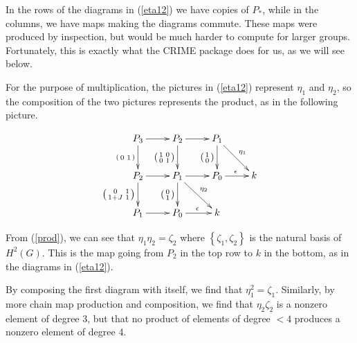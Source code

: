 \documentclass[12pt]{article}
\begin{document}
In the rows of the diagrams in (\ref{eta12}) we have copies
of $P_\ast$, while in the columns, we have maps making the diagrams
commute. These maps were produced by inspection, but would be much
harder to compute for larger groups.
Fortunately, this is exactly what the \textsf{CRIME} package
does for us, as we will see below.

For the purpose of multiplication,
the pictures in (\ref{eta12}) represent
$\eta_1$ and $\eta_2$, so the composition
of the two pictures represents the product,
as in the following picture.

\begin{equation}\label{prod}
\vcenter{\begin{xy}\xymatrix{
P_3\ar[r]
\ar[d]_{\left(\begin{smallmatrix}0&1\end{smallmatrix}\right)}
&P_2\ar[r]
\ar[d]_{\left(\begin{smallmatrix}1&0\\0&1\end{smallmatrix}\right)}
&P_1\ar[rd]^{\eta_1}
\ar[d]_{\left(\begin{smallmatrix}1\\0\end{smallmatrix}\right)}\\
P_2\ar[r]
\ar[d]_{\left(\begin{smallmatrix}0&1\\1+J&1\end{smallmatrix}\right)}
&P_1\ar[r]\ar[dr]^{\eta_2}
\ar[d]_{\left(\begin{smallmatrix}0\\1\end{smallmatrix}\right)}
&P_0\ar[r]^\epsilon
&k\\
P_1\ar[r]
&P_0\ar[r]^\epsilon
&k
}\end{xy}}
\end{equation}

From (\ref{prod}), we can see that $\eta_1\eta_2=\zeta_2$
where $\left\{\zeta_1,\zeta_2\right\}$ is the natural basis of
$H^2\left(G\right)$.
This is the map going from $P_2$ in the top row to $k$
in the bottom, as in the diagrams in (\ref{eta12}).

By composing the first diagram with itself, we find that
$\eta_1^2=\zeta_1$.
Similarly, by more chain map production and composition,
we find that $\eta_2\zeta_2$ is a nonzero
element of degree 3, but that no product of 
elements of degree $<4$ produces
a nonzero element of degree 4.
\end{document}
